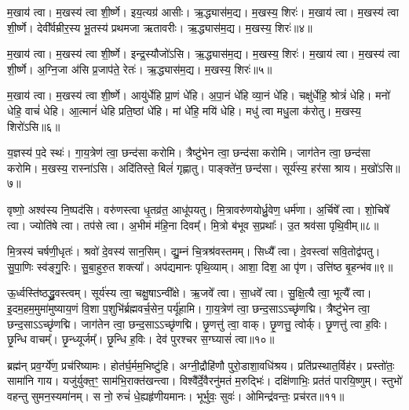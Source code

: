 म॒खाय॑ त्वा। 
म॒खस्य॑ त्वा शी॒र्ष्णे। 
इय॒त्यग्र॑ आसीः। 
ऋ॒द्ध्यास॑म॒द्य। 
म॒खस्य॒ शिरः॑। 
म॒खाय॑ त्वा। 
म॒खस्य॑ त्वा शी॒र्ष्णे। 
देवी᳚र्वम्रीर॒स्य भू॒तस्य॑ प्रथमजा ऋतावरीः। 
ऋ॒द्ध्यास॑म॒द्य। 
म॒खस्य॒ शिरः॑॥४॥

म॒खाय॑ त्वा। 
म॒खस्य॑ त्वा शी॒र्ष्णे। 
इन्द्र॒स्यौजो॑ऽसि। 
ऋ॒द्ध्यास॑म॒द्य। 
म॒खस्य॒ शिरः॑। 
म॒खाय॑ त्वा। 
म॒खस्य॑ त्वा शी॒र्ष्णे। 
अ॒ग्नि॒जा अ॑सि प्र॒जाप॑ते॒ रेतः॑। 
ऋ॒द्ध्यास॑म॒द्य। 
म॒खस्य॒ शिरः॑॥५॥

म॒खाय॑ त्वा। 
म॒खस्य॑ त्वा शी॒र्ष्णे। 
आयु॑र्धेहि प्रा॒णं धे॑हि। 
अ॒पा॒नं धे॑हि व्या॒नं धे॑हि। 
चक्षु॑र्धेहि॒ श्रोत्रं॑ धेहि। 
मनो॑ धेहि॒ वाचं॑ धेहि। 
आ॒त्मानं॑ धेहि प्रति॒ष्ठां धे॑हि। 
मां धे॑हि॒ मयि॑ धेहि। 
मधु॑ त्वा मधु॒ला क॑रोतु। 
म॒खस्य॒ शिरो॑ऽसि॥६॥

य॒ज्ञस्य॑ प॒दे स्थः॑। 
गा॒य॒त्रेण॑ त्वा॒ छन्द॑सा करोमि। 
त्रैष्टु॑भेन त्वा॒ छन्द॑सा करोमि। 
जाग॑तेन त्वा॒ छन्द॑सा करोमि। 
म॒खस्य॒ रास्ना॑ऽसि। 
अदि॑तिस्ते॒ बिलं॑ गृह्णातु। 
पाङ्क्ते॑न॒ छन्द॑सा। 
सूर्य॑स्य॒ हर॑सा श्राय। 
म॒खो॑ऽसि॥७॥
\anuvakamend[प॒ते॒ शिर॑ ऋतावरीर्\mbox{}ऋ॒द्ध्यास॑म॒द्य म॒खस्य॒ शिरः॒ शिरः॒ शिरो॑ऽसि॒ नव॑ च%
]

वृष्णो॒ अश्व॑स्य नि॒ष्पद॑सि। 
वरु॑णस्त्वा धृ॒तव्र॑त॒ आधू॑पयतु। 
मि॒त्रावरु॑णयोर्ध्रु॒वेण॒ धर्म॑णा। 
अ॒र्चिषे᳚ त्वा। 
शो॒चिषे᳚ त्वा। 
ज्योति॑षे त्वा। 
तप॑से त्वा। 
अ॒भीमं म॑हि॒ना दिवम्᳚। 
मि॒त्रो ब॑भूव स॒प्रथाः᳚। 
उ॒त श्रव॑सा पृथि॒वीम्॥८॥

मि॒त्रस्य॑ चर्\mbox{}षणी॒धृतः॑। 
श्रवो॑ दे॒वस्य॑ सान॒सिम्। 
द्यु॒म्नं चि॒त्रश्र॑वस्तमम्। 
सिध्यै᳚ त्वा। 
दे॒वस्त्वा॑ सवि॒तोद्व॑पतु। 
सु॒पा॒णिः स्व॑ङ्गु॒रिः। 
सु॒बा॒हुरु॒त शक्त्या᳚। 
अप॑द्यमानः पृथि॒व्याम्। 
आशा॒ दिश॒ आ पृ॑ण। 
उत्ति॑ष्ठ बृ॒हन्भ॑व॥९॥

ऊ॒र्ध्वस्ति॑ष्ठद्ध्रु॒वस्त्वम्। 
सूर्य॑स्य त्वा॒ चक्षु॒षाऽन्वी᳚क्षे। 
ऋ॒जवे᳚ त्वा। 
सा॒धवे᳚ त्वा। 
सु॒क्षि॒त्यै त्वा॒ भूत्यै᳚ त्वा। 
इ॒दम॒हम॒मुमा॑\-मुष्याय॒णं  वि॒शा प॒शुभि॑र्ब्रह्मवर्च॒सेन॒ पर्यू॑हामि। 
गा॒य॒त्रेण॑ त्वा॒ छन्द॒साऽऽच्छृ॑णद्मि। 
त्रैष्टु॑भेन त्वा॒ छन्द॒साऽऽच्छृ॑णद्मि। 
जाग॑तेन त्वा॒ छन्द॒साऽऽच्छृ॑णद्मि। 
छृ॒णत्तु॑ त्वा॒ वाक्। 
छृ॒णत्तु॒ त्वोर्क्। 
छृ॒णत्तु॑ त्वा ह॒विः। 
छृ॒न्धि वाचम्᳚। 
छृ॒न्ध्यूर्जम्᳚। 
छृ॒न्धि ह॒विः। 
देव॑ पुरश्चर स॒ग्घ्यासं॑ त्वा॥१०॥
\anuvakamend[पृ॒थि॒वीं भ॑व॒ वाख्षट्च॑]

ब्रह्म॑न् प्रव॒र्ग्ये॑ण॒ प्रच॑रिष्यामः। 
होत॑र्घ॒र्मम॒भिष्टु॑हि। 
अग्नी॒द्रौहि॑णौ पुरो॒डाशा॒वधि॑श्रय। 
प्रति॑प्रस्थात॒र्विह॑र। 
प्रस्तो॑तः॒ सामा॑नि गाय। 
यजु॑र्\mbox{}युक्त॒ꣳ॒ साम॑भि॒राक्त॑खन्त्वा। 
विश्वै᳚र्दे॒वैरनु॑मतं म॒रुद्भिः॑। 
दक्षि॑णाभिः॒ प्रत॑तं पारयि॒ष्णुम्। 
स्तुभो॑ वहन्तु सुमन॒स्यमा॑नम्। 
स नो॒ रुचं॑ धे॒ह्यहृ॑णीयमानः। 
भूर्भुवः॒ सुवः॑। 
ओमिन्द्र॑वन्तः॒ प्रच॑रत॥११॥
\anuvakamend[अहृ॑णीयमानो॒ द्वे च॑]

